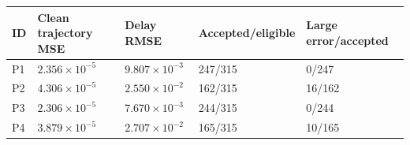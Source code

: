 \begin{tabular}{lllll}
\toprule
ID & Clean trajectory MSE & Delay RMSE & Accepted/eligible & Large error/accepted \\
\midrule
P1 & \(2.356\times10^{-5}\) & \(9.807\times10^{-3}\) & 247/315 & 0/247 \\
P2 & \(4.306\times10^{-5}\) & \(2.550\times10^{-2}\) & 162/315 & 16/162 \\
P3 & \(2.306\times10^{-5}\) & \(7.670\times10^{-3}\) & 244/315 & 0/244 \\
P4 & \(3.879\times10^{-5}\) & \(2.707\times10^{-2}\) & 165/315 & 10/165 \\
\bottomrule
\end{tabular}
